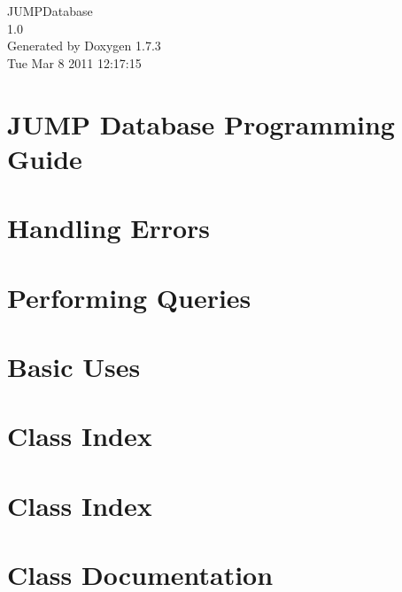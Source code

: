 \documentclass[a4paper]{book}
\begin{document}
\hypersetup{pageanchor=false}
\begin{titlepage}
\vspace*{7cm}
\begin{center}
{\Large JUMPDatabase \\[1ex]\large 1.0 }\\
\vspace*{1cm}
{\large Generated by Doxygen 1.7.3}\\
\vspace*{0.5cm}
{\small Tue Mar 8 2011 12:17:15}\\
\end{center}
\end{titlepage}
\clearemptydoublepage
{}
\tableofcontents
\clearemptydoublepage
{}
\hypersetup{pageanchor=true}
\chapter{JUMP Database Programming Guide}
\label{index}\hypertarget{index}{}
\chapter{Handling Errors}
\label{errors}
\hypertarget{errors}{}

\chapter{Performing Queries}
\label{queries}
\hypertarget{queries}{}

\chapter{Basic Uses}
\label{basic_uses}
\hypertarget{basic_uses}{}

\chapter{Class Index}

\chapter{Class Index}

\chapter{Class Documentation}



\printindex
\end{document}
